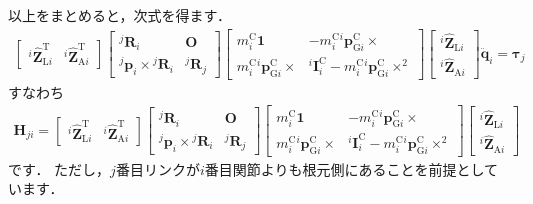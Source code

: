\documentclass{jsarticle}
\begin{document}
以上をまとめると，次式を得ます．
\begin{align*}
\left[\begin{array}{cc}
{}^{i}\hat{\bm{Z}}_{\mathrm{L}i}^{\mathrm{T}}
&
{}^{i}\hat{\bm{Z}}_{\mathrm{A}i}^{\mathrm{T}}
\end{array}\right]
\left[\begin{array}{cc}
{}^{j}\bm{R}_{i} & \bm{O}
\\
{}^{j}\bm{p}_{i}\times{}^{j}\bm{R}_{i} & {}^{j}\bm{R}_{j}
\end{array}\right]
\left[\begin{array}{cc}
m_{i}^{\mathrm{C}}\bm{1} & -m_{i}^{\mathrm{C}}{}^{i}\bm{p}_{\mathrm{G}i}^{\mathrm{C}}\times \\
m_{i}^{\mathrm{C}}{}^{i}\bm{p}_{\mathrm{G}i}^{\mathrm{C}}\times & {}^{i}\bm{I}_{i}^{\mathrm{C}}-m_{i}^{\mathrm{C}}{}^{i}\bm{p}_{\mathrm{G}i}^{\mathrm{C}}\times^{2}
\end{array}\right]
\left[\begin{array}{c}
{}^{i}\hat{\bm{Z}}_{\mathrm{L}i}
\\
{}^{i}\hat{\bm{Z}}_{\mathrm{A}i}
\end{array}\right]
\ddot{\bm{q}}_{i}
=
\bm{\tau}_{j}
\end{align*}
すなわち
\begin{align*}
\bm{H}_{ji}=
\left[\begin{array}{cc}
{}^{i}\hat{\bm{Z}}_{\mathrm{L}i}^{\mathrm{T}}
&
{}^{i}\hat{\bm{Z}}_{\mathrm{A}i}^{\mathrm{T}}
\end{array}\right]
\left[\begin{array}{cc}
{}^{j}\bm{R}_{i} & \bm{O}
\\
{}^{j}\bm{p}_{i}\times{}^{j}\bm{R}_{i} & {}^{j}\bm{R}_{j}
\end{array}\right]
\left[\begin{array}{cc}
m_{i}^{\mathrm{C}}\bm{1} & -m_{i}^{\mathrm{C}}{}^{i}\bm{p}_{\mathrm{G}i}^{\mathrm{C}}\times \\
m_{i}^{\mathrm{C}}{}^{i}\bm{p}_{\mathrm{G}i}^{\mathrm{C}}\times & {}^{i}\bm{I}_{i}^{\mathrm{C}}-m_{i}^{\mathrm{C}}{}^{i}\bm{p}_{\mathrm{G}i}^{\mathrm{C}}\times^{2}
\end{array}\right]
\left[\begin{array}{c}
{}^{i}\hat{\bm{Z}}_{\mathrm{L}i}
\\
{}^{i}\hat{\bm{Z}}_{\mathrm{A}i}
\end{array}\right]
\end{align*}
です．
ただし，$j$番目リンクが$i$番目関節よりも根元側にあることを前提としています．
\end{document}
